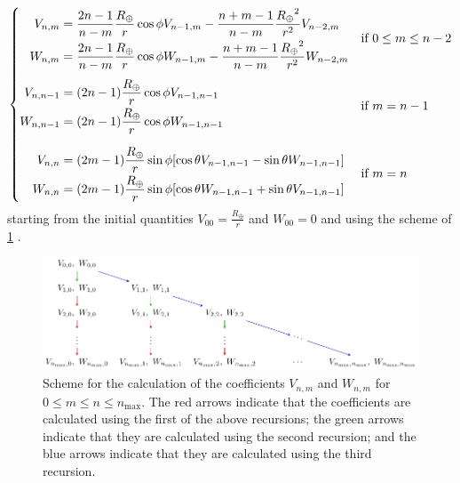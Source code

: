 \documentclass[../main.tex]{subfiles}
\begin{document}
\begin{align}
  \begin{cases}
    \hspace{8pt}\begin{aligned}
                  V_{n,m} & =\frac{2n-1}{n-m} \frac{R_\oplus}{r}\cos\phi V_{n-1,m}-\frac{n+m-1}{n-m}\frac{{R_\oplus}^2}{r^2}V_{n-2,m} \\[0.1cm]
                  W_{n,m} & =\frac{2n-1}{n-m} \frac{R_\oplus}{r}\cos\phi W_{n-1,m}-\frac{n+m-1}{n-m}\frac{{R_\oplus}^2}{r^2}W_{n-2,m}
                \end{aligned} & \text{if $0\leq m\leq n-2$} \\[0.9cm]
    \begin{aligned}
      V_{n,n-1} & =(2n-1) \frac{R_\oplus}{r}\cos\phi V_{n-1,n-1} \\[0.1cm]
      W_{n,n-1} & =(2n-1) \frac{R_\oplus}{r}\cos\phi W_{n-1,n-1}
    \end{aligned}                                                                                       & \text{if $m=n-1$}                                               \\[0.9cm]
    \hspace{10.25pt}\begin{aligned}
                      V_{n,n} & =(2m-1)\frac{R_\oplus}{r}\sin\phi[\cos\theta V_{n-1,n-1}-\sin\theta W_{n-1,n-1}] \\[0.1cm]
                      W_{n,n} & =(2m-1)\frac{R_\oplus}{r}\sin\phi[\cos\theta W_{n-1,n-1}+\sin\theta V_{n-1,n-1}]
                    \end{aligned}                 & \text{if $m=n$}
  \end{cases}
\end{align}
starting from the initial quantities $V_{00}= \frac{R_\oplus}{r}$ and $W_{00}= 0$ and using the scheme of \cref{fig:SHcoeffs} \cite{montenbruck}.
\begin{figure}
  \centering
  \includegraphics[width=\textwidth]{Images/scheme_recursion.pdf}
  \caption{Scheme for the calculation of the coefficients $V_{n,m}$ and $W_{n,m}$ for $0\leq m\leq n\leq n_\mathrm{max}$. The red arrows indicate that the coefficients are calculated using the first of the above recursions; the green arrows indicate that they are calculated using the second recursion; and the blue arrows indicate that they are calculated using the third recursion.}
  \label{fig:SHcoeffs}
\end{figure}
\end{document}
